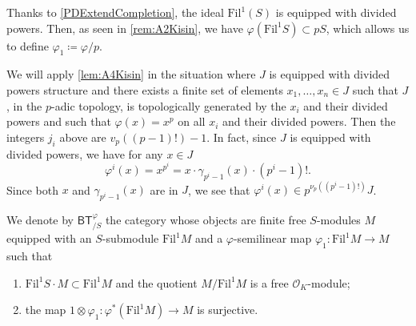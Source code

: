\begin{ntt}[]\label{not:phi1S}
	Thanks to \cref{PDExtendCompletion}, the ideal 
	$\mathrm{Fil}^1(S)$ is equipped with divided powers.
	Then, as seen in \cref{rem:A2Kisin}, 
	we have $\varphi( \mathrm{Fil}^1 S) \subset p S$, which
	allows us to define $\varphi_1 \coloneqq \varphi/p$.
\end{ntt}


\begin{rem}[]\label{rem:j_iTheoremA6}
	We will apply \cref{lem:A4Kisin} in the situation where $J$ is equipped
	with divided powers structure and there exists a finite set of 
	elements $x_1, \ldots, x_n \in J$ such that $J$, in the $p$-adic topology, 
	is topologically generated by the $x_i$ and their divided powers
	and such that $\varphi(x) = x^p$ on all $x_i$ and their divided powers.
	Then the integers $j_i$ above are $v_p \left( (p-1)! \right) - 1$.
	In fact, since $J$ is equipped with divided powers, we have for any $x \in J$
	\begin{equation*}
		\varphi^i(x) =
		x^{p^i} =
		x \cdot \gamma_{p^i-1}(x) \cdot (p^i-1)!
	.\end{equation*}
	Since both $x$ and $\gamma_{p^i-1}(x)$ are in $J$,
	we see that $\varphi^i(x) \in p^{\nu_p((p^i-1)!)}J$.
\end{rem}


\begin{defn}[]
	We denote by $\mathsf{BT}^{\varphi}_{/S}$ the category
	whose objects are finite free $S$-modules $M$
	equipped with an $S$-submodule $\mathrm{Fil}^1 M$
	and a $\varphi$-semilinear map $\varphi_1\colon  \mathrm{Fil}^1 M \to M$
	such that
\begin{enumerate}
	\item $\mathrm{Fil}^1 S \cdot M \subset \mathrm{Fil}^1 M$
		and the quotient $M/\mathrm{Fil}^1 M$ is a free $\mathcal{O}_{ K }$-module;
	\item the map $1 \otimes \varphi_1\colon 
		\varphi^* \left( \mathrm{Fil}^1 M \right) \to M$
		is surjective.
\end{enumerate}
\end{defn}



